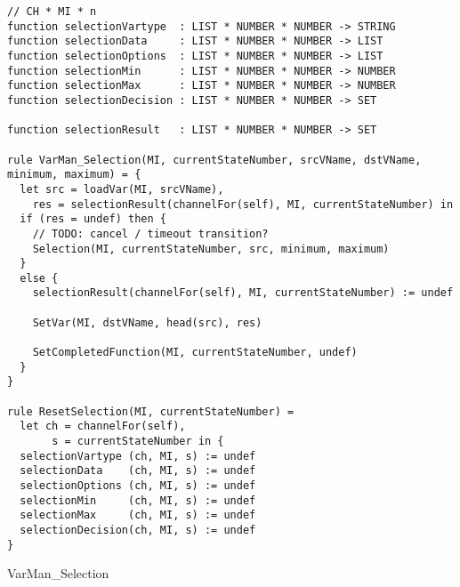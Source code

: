 \begin{listing}[H]
\begin{verbatim}
// CH * MI * n
function selectionVartype  : LIST * NUMBER * NUMBER -> STRING
function selectionData     : LIST * NUMBER * NUMBER -> LIST
function selectionOptions  : LIST * NUMBER * NUMBER -> LIST
function selectionMin      : LIST * NUMBER * NUMBER -> NUMBER
function selectionMax      : LIST * NUMBER * NUMBER -> NUMBER
function selectionDecision : LIST * NUMBER * NUMBER -> SET

function selectionResult   : LIST * NUMBER * NUMBER -> SET

rule VarMan_Selection(MI, currentStateNumber, srcVName, dstVName, minimum, maximum) = {
  let src = loadVar(MI, srcVName),
    res = selectionResult(channelFor(self), MI, currentStateNumber) in
  if (res = undef) then {
    // TODO: cancel / timeout transition?
    Selection(MI, currentStateNumber, src, minimum, maximum)
  }
  else {
    selectionResult(channelFor(self), MI, currentStateNumber) := undef

    SetVar(MI, dstVName, head(src), res)

    SetCompletedFunction(MI, currentStateNumber, undef)
  }
}

rule ResetSelection(MI, currentStateNumber) =
  let ch = channelFor(self),
       s = currentStateNumber in {
  selectionVartype (ch, MI, s) := undef
  selectionData    (ch, MI, s) := undef
  selectionOptions (ch, MI, s) := undef
  selectionMin     (ch, MI, s) := undef
  selectionMax     (ch, MI, s) := undef
  selectionDecision(ch, MI, s) := undef
}
\end{verbatim}
\caption{VarMan\_Selection}
\label{lst:asm:VarMan_Selection}
\end{listing}




